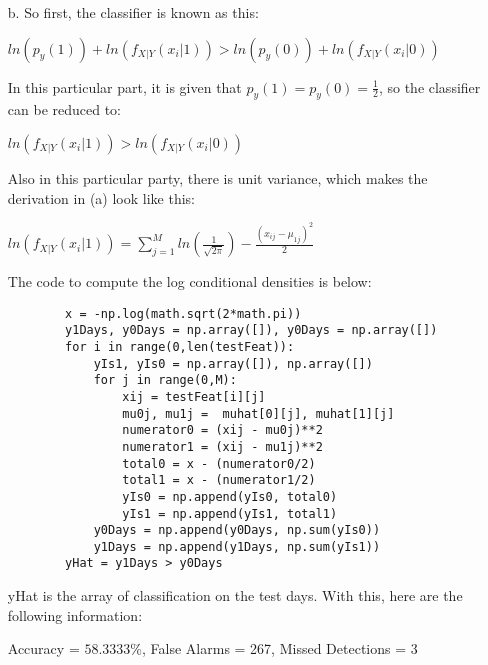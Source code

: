 \documentclass{article}
\begin{document}
\begin{enumerate}
	\item[b.] So first, the classifier is known as this:
	\begin{center}
		$ln(p_{y}(1)) + ln (f_{X|Y}(x_{i}| 1)) > ln(p_{y}(0)) + ln(f_{X|Y}(x_{i} | 0))$
	\end{center}
	In this particular part, it is given that $p_{y}(1) = p_{y}(0) = \frac{1}{2}$, so the classifier can be reduced to: 
	\begin{center}
		$ ln (f_{X|Y}(x_{i}| 1)) > ln(f_{X|Y}(x_{i} | 0))$
	\end{center}
	Also in this particular party, there is unit variance, which makes the derivation in (a) look like this:
	\begin{center}
		$ln(f_{X|Y}(x_{i}| 1)) = \sum_{j=1}^{M} ln(\displaystyle \frac{1}{\sqrt{2\pi}}) - \displaystyle \frac{(x_{ij} - \mu_{1j})^2}{2}$
	\end{center}
	The code to compute the log conditional densities is below: 
	\begin{verbatim}
		x = -np.log(math.sqrt(2*math.pi))
		y1Days, y0Days = np.array([]), y0Days = np.array([])
		for i in range(0,len(testFeat)):
		    yIs1, yIs0 = np.array([]), np.array([])
		    for j in range(0,M):
		        xij = testFeat[i][j]
		        mu0j, mu1j =  muhat[0][j], muhat[1][j]
		        numerator0 = (xij - mu0j)**2
		        numerator1 = (xij - mu1j)**2
		        total0 = x - (numerator0/2)
		        total1 = x - (numerator1/2)
		        yIs0 = np.append(yIs0, total0)
		        yIs1 = np.append(yIs1, total1)
		    y0Days = np.append(y0Days, np.sum(yIs0))
		    y1Days = np.append(y1Days, np.sum(yIs1))
		yHat = y1Days > y0Days
	\end{verbatim}
	yHat is the array of classification on the test days. With this, here are the following information:
	\begin{center}
		Accuracy = $58.3333\%$,
		False Alarms = 267,
		Missed Detections = 3
	\end{center}
	

\end{enumerate}
\end{document}
